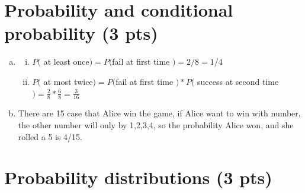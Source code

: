 \documentclass[11pt]{article}
\begin{document}
\section{Probability and conditional probability (3 pts)}
\begin{enumerate}[(a)]
  \item 
  \begin{enumerate}[(i)]
  	\item $P($ at least once$) = P( $fail at first time $) = 2 / 8 = 1/4$
 	\item $P($ at most twice$) = P( $fail at first time $) * P($ success at second time $) = \frac{2}{8} * \frac{6}{8} 	= \frac{3}{16}$
  \end{enumerate}  
  \item  There are 15 case that Alice win the game, if Alice want to win with number, the other number will only by 1,2,3,4, so the probability Alice won, and she rolled a 5 is 4/15.
\end{enumerate}


\section{Probability distributions (3 pts)}
\end{document}
